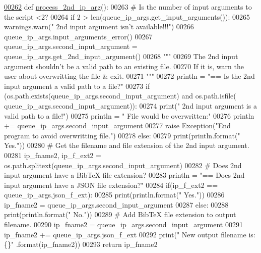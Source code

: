 \begin{DoxyCode}
\hypertarget{classutilities_1_1queue__ip__arguments_1_1queue__ip__args_l00262}{}\hyperlink{classutilities_1_1queue__ip__arguments_1_1queue__ip__args_a82d245379c48196f61d4268882dd5c6d}{00262}     \textcolor{keyword}{def }\hyperlink{classutilities_1_1queue__ip__arguments_1_1queue__ip__args_a82d245379c48196f61d4268882dd5c6d}{process\_2nd\_ip\_arg}():
00263         \textcolor{comment}{#   Is the number of input arguments to the script <2?}
00264         \textcolor{keywordflow}{if} 2 > len(queue\_ip\_args.get\_input\_arguments()):
00265             warnings.warn(\textcolor{stringliteral}{" 2nd input argument isn't available!!!"})
00266             queue\_ip\_args.input\_arguments\_error()
00267         queue\_ip\_args.second\_input\_argument = queue\_ip\_args.get\_2nd\_input\_argument()
00268         \textcolor{stringliteral}{"""}
00269 \textcolor{stringliteral}{        The 2nd input argument shouldn't be a valid path to an existing file.}
00270 \textcolor{stringliteral}{        If it is, warn the user about overwritting the file & exit.}
00271 \textcolor{stringliteral}{        """}
00272         println = \textcolor{stringliteral}{"==   Is the 2nd input argument a valid path to a file?"}
00273         \textcolor{keywordflow}{if} (os.path.exists(queue\_ip\_args.second\_input\_argument) \textcolor{keywordflow}{and} os.path.isfile(
      queue\_ip\_args.second\_input\_argument)):
00274             print(\textcolor{stringliteral}{" 2nd input argument is a valid path to a file!"})
00275             println = \textcolor{stringliteral}{" File would be overwritten:"}
00276             println += queue\_ip\_args.second\_input\_argument
00277             \textcolor{keywordflow}{raise} Exception(\textcolor{stringliteral}{"End program to avoid overwritting file."})
00278         \textcolor{keywordflow}{else}:
00279             print(println.format(\textcolor{stringliteral}{"  Yes."}))
00280         \textcolor{comment}{#   Get the filename and file extension of the 2nd input argument.}
00281         ip\_fname2, ip\_f\_ext2 = os.path.splitext(queue\_ip\_args.second\_input\_argument)
00282         \textcolor{comment}{#   Does 2nd input argument have a BibTeX file extension?}
00283         println = \textcolor{stringliteral}{"==   Does 2nd input argument have a JSON file extension?"}
00284         if(ip\_f\_ext2 == queue\_ip\_args.json\_f\_ext):
00285             print(println.format(\textcolor{stringliteral}{"  Yes."}))
00286             ip\_fname2 = queue\_ip\_args.second\_input\_argument
00287         \textcolor{keywordflow}{else}:
00288             print(println.format(\textcolor{stringliteral}{"  No."}))
00289             \textcolor{comment}{#   Add BibTeX file extension to output filename.}
00290             ip\_fname2 = queue\_ip\_args.second\_input\_argument
00291             ip\_fname2 += queue\_ip\_args.json\_f\_ext
00292             print(\textcolor{stringliteral}{" New output filename is: \{\}"} .format(ip\_fname2))
00293         \textcolor{keywordflow}{return} ip\_fname2
\end{DoxyCode}
